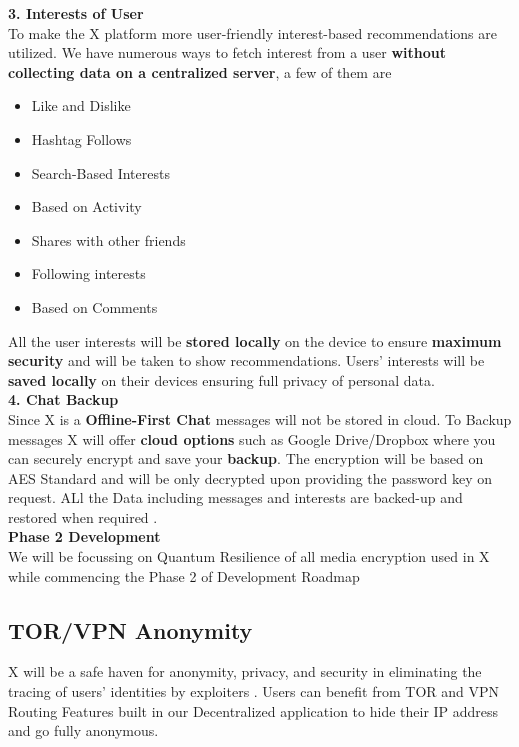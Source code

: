 \documentclass[letterpaper,11pt]{article}
\begin{document}
\textbf{3. Interests of User}\\


To make the X platform more user-friendly interest-based recommendations are utilized. We have numerous ways to fetch interest from a user \textbf{without collecting data on a centralized server}, a few of them are
\begin{itemize}[wide, labelwidth=!, labelindent=0pt]
\item Like and Dislike
\item Hashtag Follows
\item Search-Based Interests
\item Based on Activity
\item Shares with other friends
\item Following interests
\item Based on Comments
\end{itemize}

All the user interests will be \textbf{stored locally} on the device to ensure \textbf{maximum security} and will be taken to show recommendations. Users' interests will be \textbf{saved locally} on their devices ensuring full privacy of personal data.\\

\textbf{4. Chat Backup}\\

Since X is a \textbf{Offline-First Chat} messages will not be stored in cloud. To Backup messages X will offer \textbf{cloud options} such as Google Drive/Dropbox where you can securely encrypt and save your \textbf{backup}. The encryption will be based on AES Standard and will be only decrypted upon providing the password key on request. ALl the Data including messages and interests are backed-up and restored when required .\\

\textbf{Phase 2 Development}\\

We will be focussing on Quantum Resilience of all media encryption used in X while commencing the Phase 2 of Development Roadmap\\

\subsection{\textbf{TOR/VPN Anonymity}}

X will be a safe haven for anonymity, privacy, and security in eliminating the tracing of users' identities by exploiters . Users can benefit from TOR and VPN Routing Features built in our Decentralized application to hide their IP address and go fully anonymous.\\
\end{document}
